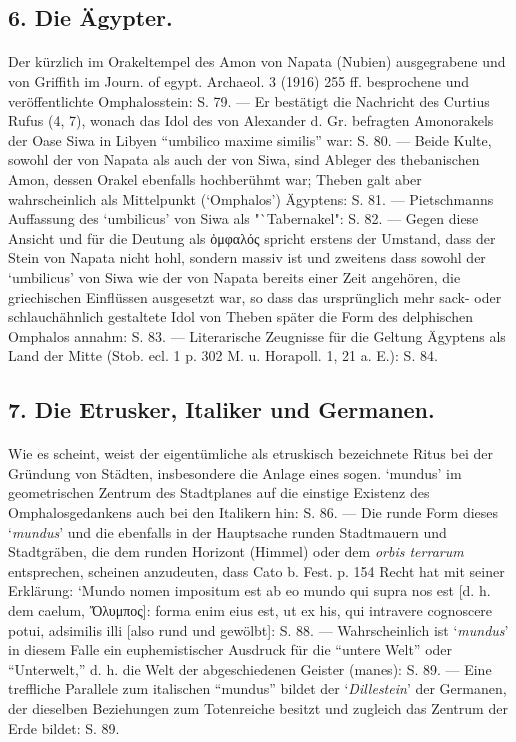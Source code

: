 \documentclass[a4paper, 11pt, oneside]{article}
\begin{document}
\subsection*{6. Die Ägypter.}
\paragraph{}
Der kürzlich im Orakeltempel des Amon von Napata (Nubien) ausgegrabene und von Griffith im Journ. of egypt. Archaeol. 3 (1916) 255 ff. besprochene und veröffentlichte Omphalosstein: S. 79. --- Er bestätigt die Nachricht des Curtius Rufus (4, 7), wonach das Idol des von Alexander d. Gr. befragten Amonorakels der Oase Siwa in Libyen "`umbilico maxime similis"' war: S. 80. --- Beide Kulte, sowohl der von Napata als auch der von Siwa, sind Ableger des thebanischen Amon, dessen Orakel ebenfalls hochberühmt war; Theben galt aber wahrscheinlich als Mittelpunkt (`Omphalos') Ägyptens: S. 81. --- Pietschmanns Auffassung des `umbilicus' von Siwa als "`Tabernakel": S. 82. --- Gegen diese Ansicht und für die Deutung als ὀμφαλός spricht erstens der Umstand, dass der Stein von Napata nicht hohl, sondern massiv ist und zweitens dass sowohl der `umbilicus' von Siwa wie der von Napata bereits einer Zeit angehören, die griechischen Einflüssen ausgesetzt war, so dass das ursprünglich mehr sack- oder schlauchähnlich gestaltete Idol von Theben später die Form des delphischen Omphalos annahm: S. 83. --- Literarische Zeugnisse für die Geltung Ägyptens als Land der Mitte (Stob. ecl. 1 p. 302 M. u. Horapoll. 1, 21 a. E.): S. 84.

\subsection*{7. Die Etrusker, Italiker und Germanen.}
\paragraph{}
Wie es scheint, weist der eigentümliche als etruskisch bezeichnete Ritus bei der Gründung von Städten, insbesondere die Anlage eines sogen. `mundus' im geometrischen Zentrum des Stadtplanes auf die einstige Existenz des Omphalosgedankens auch bei den Italikern hin: S. 86. --- Die runde Form dieses `\emph{mundus}' und die ebenfalls in der Hauptsache runden Stadtmauern und Stadtgräben, die dem runden Horizont (Himmel) oder dem \emph{orbis terrarum} entsprechen, scheinen anzudeuten, dass Cato b. Fest. p. 154 Recht hat mit seiner Erklärung: `Mundo nomen impositum est ab eo mundo qui supra nos est [d. h. dem caelum, Ὄλυμπος]: forma enim eius est, ut ex his, qui intravere cognoscere potui, adsimilis illi [also rund und gewölbt]: S. 88. --- Wahrscheinlich ist `\emph{mundus}' in diesem Falle ein euphemistischer Ausdruck für die "`untere Welt"' oder "`Unterwelt,"' d. h. die Welt der abgeschiedenen Geister (manes): S. 89. --- Eine treffliche Parallele zum italischen "`mundus"' bildet der `\emph{Dillestein}' der Germanen, der dieselben Beziehungen zum Totenreiche besitzt und zugleich das Zentrum der Erde bildet: S. 89.
\end{document}
